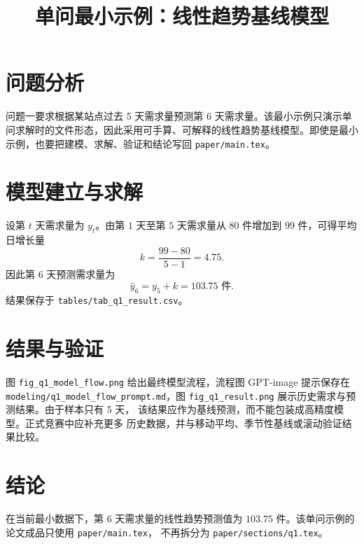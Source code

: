 \documentclass[12pt]{ctexart}
\title{单问最小示例：线性趋势基线模型}
\author{}
\date{}
\begin{document}
\maketitle

\section{问题分析}

问题一要求根据某站点过去 5 天需求量预测第 6 天需求量。该最小示例只演示单问求解时的文件形态，因此采用可手算、可解释的线性趋势基线模型。即使是最小示例，也要把建模、求解、验证和结论写回 \verb|paper/main.tex|。

\section{模型建立与求解}

设第 \(t\) 天需求量为 \(y_t\)。由第 \(1\) 天至第 \(5\) 天需求量从
\(80\) 件增加到 \(99\) 件，可得平均日增长量
\[
k=\frac{99-80}{5-1}=4.75.
\]
因此第 \(6\) 天预测需求量为
\[
\hat y_6=y_5+k=103.75\text{ 件}.
\]
结果保存于 \verb|tables/tab_q1_result.csv|。

\section{结果与验证}

图 \verb|fig_q1_model_flow.png| 给出最终模型流程，流程图 GPT-image 提示保存在
\verb|modeling/q1_model_flow_prompt.md|，图
\verb|fig_q1_result.png| 展示历史需求与预测结果。由于样本只有 5 天，
该结果应作为基线预测，而不能包装成高精度模型。正式竞赛中应补充更多
历史数据，并与移动平均、季节性基线或滚动验证结果比较。

\section{结论}

在当前最小数据下，第 \(6\) 天需求量的线性趋势预测值为
\(103.75\) 件。该单问示例的论文成品只使用 \verb|paper/main.tex|，
不再拆分为 \verb|paper/sections/q1.tex|。
\end{document}
